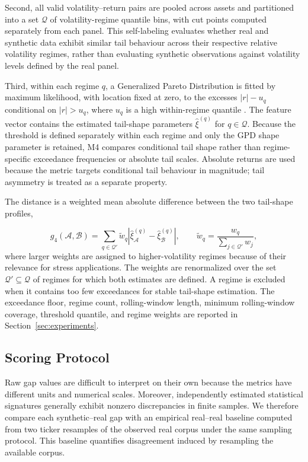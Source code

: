 Second, all valid volatility--return pairs are pooled across assets and
partitioned into a set $\mathcal{Q}$ of volatility-regime quantile bins,
with cut points computed separately from each panel.
This self-labeling evaluates whether real and synthetic data exhibit
similar tail behaviour across their respective relative volatility
regimes, rather than evaluating synthetic observations against
volatility levels defined by the real panel.

Third, within each regime $q$, a Generalized Pareto Distribution is
fitted by maximum likelihood, with location fixed at zero, to the
excesses $|r|-u_q$ conditional on $|r|>u_q$, where $u_q$ is a high
within-regime quantile \citep{mcneil2000estimation}.
The feature vector contains the estimated tail-shape parameters
$\hat{\xi}^{(q)}$ for $q\in\mathcal{Q}$.
Because the threshold is defined separately within each regime and only
the GPD shape parameter is retained, M4 compares conditional tail shape
rather than regime-specific exceedance frequencies or absolute tail
scales.
Absolute returns are used because the metric targets conditional tail
behaviour in magnitude; tail asymmetry is treated as a separate
property.

The distance is a weighted mean absolute difference between the two
tail-shape profiles,

\begin{equation}
g_4(\mathcal{A},\mathcal{B})
= \sum_{q\in\mathcal{Q}'}
\tilde{w}_q
\left|
\hat{\xi}_{\mathcal{A}}^{(q)}
-
\hat{\xi}_{\mathcal{B}}^{(q)}
\right|,
\qquad
\tilde{w}_q
= \frac{w_q}
{\sum_{j\in\mathcal{Q}'} w_j},
\label{eq:m4}
\end{equation}
where larger weights are assigned to higher-volatility regimes because
of their relevance for stress applications.
The weights are renormalized over the set
$\mathcal{Q}'\subseteq\mathcal{Q}$ of regimes for which both estimates
are defined.
A regime is excluded when it contains too few exceedances for stable
tail-shape estimation.
The exceedance floor, regime count, rolling-window length, minimum
rolling-window coverage, threshold quantile, and regime weights are
reported in Section~\ref{sec:experiments}.


\subsection{Scoring Protocol}\label{sec:method_scoring}

Raw gap values are difficult to interpret on their own because the metrics
have different units and numerical scales.
Moreover, independently estimated statistical signatures generally exhibit
nonzero discrepancies in finite samples.
We therefore compare each synthetic--real gap with an empirical real--real
baseline computed from two ticker resamples of the observed real corpus under
the same sampling protocol.
This baseline quantifies disagreement induced by resampling the available
corpus.

